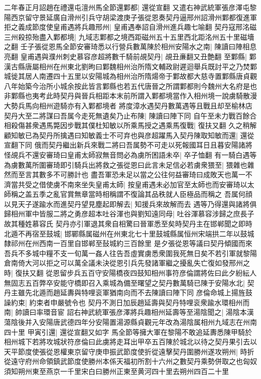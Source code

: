 二年春正月詔趙在禮還屯澶州馬全節還鄴都|{
	還從宣翻}
又遣右神武統軍張彦澤屯黎陽西京留守景延廣自滑州引兵守胡梁渡庚子張從恩奏契丹逼邢州詔滑州鄴都復進軍拒之義成節度使皇甫遇將兵趣邢州|{
	皇甫遇奉詔自滑州進兵趣七喻翻}
契丹寇邢洺磁三州殺掠殆盡入鄴都境|{
	九域志鄴都之境西距磁州五十五里西北距洺州五十里磁墻之翻}
壬子張從恩馬全節安審琦悉以行營兵數萬陳於相州安陽水之南|{
	陳讀曰陣相息亮翻}
皇甫遇與濮州刺史慕容彦超將數千騎前覘契丹|{
	覘丑亷翻又丑艶翻}
至鄴縣|{
	鄴漢古縣唐屬相州在州東北劉昫曰鄴魏相州治所隋文輔政尉遲迴舉兵既討平之乃焚鄴城徙其居人南遷四十五里以安陽城為相州治所隋煬帝于鄴故都大慈寺置鄴縣唐貞觀八年始築今治所小城余按此皆言鄴縣也若五代唐晉之所謂鄴都則今魏州大名府是也非鄴縣也夷考此時契丹與晉兵相距本末前所謂入鄴都境當作入相州境一說虜騎散漫大勢兵馬向相州遊騎亦有入鄴都境者}
將度漳水遇契丹數萬遇等且戰且却至榆林店契丹大至二將謀曰吾属今走死無遺矣乃止布陳|{
	陳讀曰陣下同}
自午至未力戰百餘合相殺傷甚衆遇馬斃因步戰其僕杜知敏以所乘馬授之遇乘馬復戰|{
	復扶又翻}
久之稍解顧知敏已為契丹所擒遇曰知敏義士不可弃也與彦超躍馬入契丹陳取知敏而還|{
	還從宣翻下同}
俄而契丹繼出新兵來戰二將曰吾属勢不可走以死報國耳日且暮安陽諸將怪覘兵不還安審琦曰皇甫太師寂無音問必為虜所困語未卒|{
	卒子恤翻}
有一騎白遇等為虜數萬所圍審琦即引騎兵出將救之張從恩曰此言未足信必若虜衆猥至|{
	猥雜也雜然而至言其數多不可勝計也}
盡吾軍恐未足以當之公往何益審琦曰成敗天也萬一不濟當共受之借使虜不南來坐失皇甫太師|{
	按皇甫遇未必加官至太師也而安審琦以太師稱之盖五季之亂官賞無章當時相稱謂不復論其品秩就人臣極品而稱之}
吾属何顔以見天子遂踰水而進契丹望見塵起即解去|{
	知援兵來故解而去}
遇等乃得還與諸將俱歸相州軍中皆服二將之勇彦超本吐谷渾也與劉知遠同母|{
	吐谷渾慕容涉歸之庶長子故其種姓慕容氏}
契丹亦引軍退其衆自相驚曰晉軍悉至矣時契丹主在邯郸聞之即時北遁不再宿至鼓城|{
	邯鄲縣属磁州在州東北七十里鼓城縣属恒州宋端拱二年以鼓城隸祁州在州西南一百里自邯郸至鼔城約三百餘里}
是夕張從恩等議曰契丹傾國而來吾兵不多城中糧不支一旬萬一姦人往告吾虛實虜悉衆圍我死無日矣不若引軍就黎陽倉南倚大河以拒之可以萬全議未決從恩引兵先發諸軍繼之擾亂失亡復如發邢州之時|{
	復扶又翻}
從恩留步兵五百守安陽橋夜四鼓知相州事符彦倫謂將佐曰此夕紛紜人無固志五百弊卒安能守橋即召入乘城為備至曙望之契丹數萬騎已陳于安陽水北|{
	契丹主雖先北遁而趙延夀與特哩衮軍猶南向而不去陳讀曰陣下同}
彦倫命城上揚旌鼓譟約束|{
	約束者申嚴號令也}
契丹不測日加辰趙延壽與契丹特哩衮衆踰水環相州而南|{
	帥讀曰率環音宦}
詔右神武統軍張彦澤將兵趣相州延壽等至湯陰聞之|{
	湯陰本漢蕩陰後并入安陽唐武德四年分安陽置湯源縣貞觀元年改為湯陰属相州九域志在州南四十里}
甲寅引還|{
	還從宣翻又如字}
馬全節等擁大軍在黎陽不敢追延夀悉陳甲騎於相州城下若將攻城狀符彦倫曰此虜將走耳出甲卒五百陳於城北以待之契丹果引去以天平節度使張從恩權東京留守庚申振武節度使折從遠擊契丹圍勝州遂攻朔州|{
	時折從遠守府州命領鎮武節度使勝州本係天福初所割十六州之數契丹乘勢併取之也匈奴須知朔州東至燕京一千里宋白曰勝州正東至黄河四十里去朔州四百二十里}
